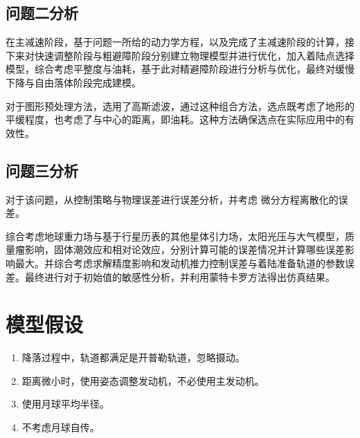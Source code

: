 \documentclass{ctexart}
\begin{document}
    \subsection{问题二分析}
    在主减速阶段，基于问题一所给的动力学方程，以及完成了主减速阶段的计算，接下来对快速调整阶段与粗避障阶段分别建立物理模型并进行优化，加入着陆点选择模型，综合考虑平整度与油耗，基于此对精避障阶段进行分析与优化，最终对缓慢下降与自由落体阶段完成建模。

对于图形预处理方法，选用了高斯滤波，通过这种组合方法，选点既考虑了地形的平缓程度，也考虑了与中心的距离，即油耗。这种方法确保选点在实际应用中的有效性。
    \subsection{问题三分析}
    对于该问题，从控制策略与物理误差进行误差分析，并考虑
微分方程离散化的误差。

综合考虑地球重力场与基于行星历表的其他星体引力场，太阳光压与大气模型，质量瘤影响，固体潮效应和相对论效应，分别计算可能的误差情况并计算哪些误差影响最大。并综合考虑求解精度影响和发动机推力控制误差与着陆准备轨道的参数误差。最终进行对于初始值的敏感性分析，并利用蒙特卡罗方法得出仿真结果。
    \section{模型假设}
    \begin{enumerate}[(1)]
        \item 降落过程中，轨道都满足是开普勒轨道，忽略摄动。
        \item 距离微小时，使用姿态调整发动机，不必使用主发动机。
        \item 使用月球平均半径。
        \item 不考虑月球自传。
    \end{enumerate}
\end{document}

